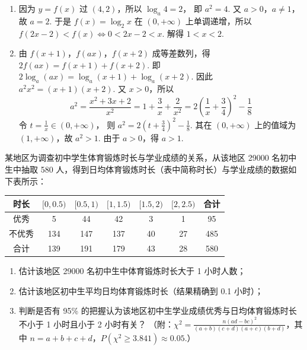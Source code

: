 \begin{solution}
\begin{enumerate}
\item 因为 \(y=f(x)\) 过 \((4,2)\)，所以
\(\log_a 4=2\)，
即
\(a^2=4\).
又 \(a>0\)，\(a\ne 1\)，故 \(a=2\).
于是 \(f(x)=\log_2 x\) 在 \((0,+\infty)\) 上单调递增，所以
\(f(2x-2)<f(x) \iff 0<2x-2<x\).
解得
\(1<x<2\).

\item 由 \(f(x+1)\)，\(f(ax)\)，\(f(x+2)\) 成等差数列，得
\(2f(ax)=f(x+1)+f(x+2)\).
即
\(2\log_a(ax)=\log_a(x+1)+\log_a(x+2)\).
因此
\(a^2x^2=(x+1)(x+2)\).
又 \(x>0\)，所以
\[
a^2=\frac{x^2+3x+2}{x^2}=1+\frac{3}{x}+\frac{2}{x^2}=2\left( \frac{1}{x}+\frac{3}{4} \right)^2-\frac{1}{8}
\]
令
\(t=\frac{1}{x}\in(0,+\infty)\)，
则
\(a^2=2\left( t+\frac{3}{4} \right)^2-\frac{1}{8}\).
其在 \((0,+\infty)\) 上的值域为 \((1,+\infty)\)，故
\(a^2>1\).
由于 \(a>0\)，得
\(a>1\).
\end{enumerate}
\end{solution}

\begin{problem}
某地区为调查初中学生体育锻炼时长与学业成绩的关系，从该地区 29000 名初中生中抽取 580 人，得到日均体育锻炼时长（表中简称时长）与学业成绩的数据如下表所示：

\begin{center}
\begin{tabular}{|c|c|c|c|c|c|c|}
\hline
时长 & \([0,0.5)\) & \([0.5,1)\) & \([1,1.5)\) & \([1.5,2)\) & \([2,2.5)\) & 合计 \\
\hline
优秀 & 5 & 44 & 42 & 3 & 1 & 95 \\
\hline
不优秀 & 134 & 147 & 137 & 40 & 27 & 485 \\
\hline
合计 & 139 & 191 & 179 & 43 & 28 & 580 \\
\hline
\end{tabular}
\end{center}

\begin{enumerate}
\item 估计该地区 29000 名初中生中体育锻炼时长大于 1 小时人数；
\item 估计该地区初中生平均日均体育锻炼时长（结果精确到 0.1 小时）；
\item 判断是否有 95\% 的把握认为该地区初中生学业成绩优秀与日均体育锻炼时长不小于 1 小时且小于 2 小时有关？
（附：\(\chi^2=\frac{n(ad-bc)^2}{(a+b)(c+d)(a+c)(b+d)}\)，其中 \(n=a+b+c+d\)，\(P(\chi^2\ge 3.841)\approx 0.05\).）
\end{enumerate}
\end{problem}

